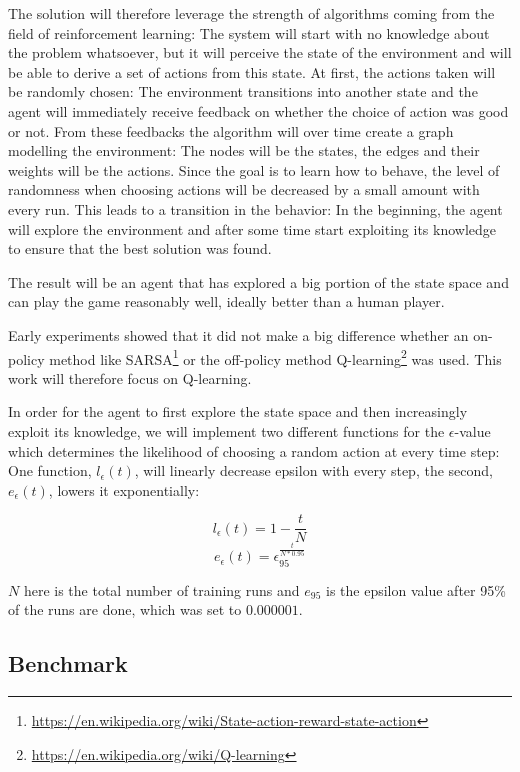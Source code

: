\documentclass[a4paper,10pt]{article}
\begin{document}
The solution will therefore leverage the strength of algorithms coming from the field of reinforcement learning:
The system will start with no knowledge about the problem whatsoever, but it will perceive the state of the environment and will be able to derive a set of actions from this state.
At first, the actions taken will be randomly chosen: 
The environment transitions into another state and the agent will immediately receive feedback on whether the choice of action was good or not.
From these feedbacks the algorithm will over time create a graph modelling the environment:
The nodes will be the states, the edges and their weights will be the actions.
Since the goal is to learn how to behave, the level of randomness when choosing actions will be decreased by a small amount with every run.
This leads to a transition in the behavior: In the beginning, the agent will explore the environment and after some time start exploiting its knowledge to ensure that the best solution was found.

The result will be an agent that has explored a big portion of the state space and can play the game reasonably well, ideally better than a human player.

Early experiments showed that it did not make a big difference whether an on-policy method like SARSA\footnote{\url{https://en.wikipedia.org/wiki/State-action-reward-state-action}} or the off-policy method Q-learning\footnote{\url{https://en.wikipedia.org/wiki/Q-learning}} was used.
This work will therefore focus on Q-learning.

In order for the agent to first explore the state space and then increasingly exploit its knowledge, we will implement two different functions for the $\epsilon$-value which determines the likelihood of choosing a random action at every time step:
One function, $l_\epsilon(t)$, will linearly decrease epsilon with every step, the second, $e_\epsilon(t)$, lowers it exponentially:

\[l_\epsilon(t) = 1 - \frac{t}{N}\]
\[e_\epsilon(t) = \epsilon_{95}^\frac{t}{N*0.95}\]

$N$ here is the total number of training runs and $e_{95}$ is the epsilon value after 95\% of the runs are done, which was set to $0.000001$.

\subsection{Benchmark}
\end{document}
